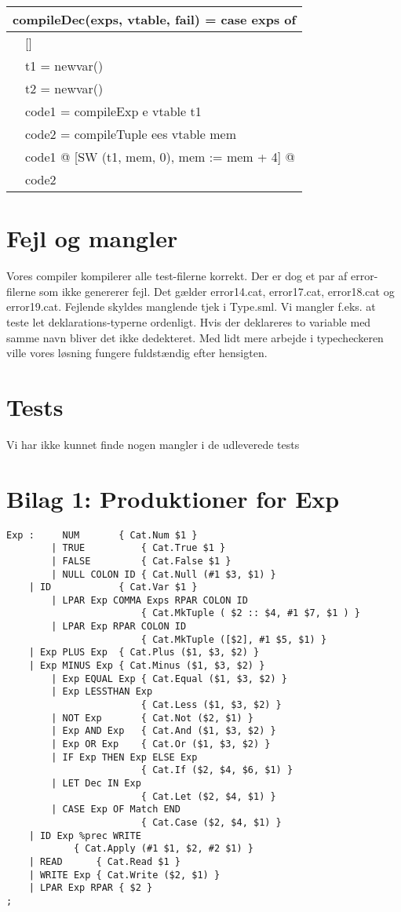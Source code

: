 \documentclass [10pt,a4paper]{article}
\begin{document}
\begin{tabular}{|l|l|}
  \hline
  \multicolumn{2}{|l|}{compileDec(exps, vtable, fail) = case exps of}
  \\ \hline
  [] & [] \\ \hline
  & t1 = newvar() \\
  & t2 = newvar() \\
  & code1 = compileExp e vtable t1 \\
  & code2 = compileTuple ees vtable mem \\
  & code1 @ [SW (t1, mem, 0), mem := mem + 4] @ \\
  & code2 \\ \hline
\end{tabular}

\section{Fejl og mangler}

Vores compiler kompilerer alle test-filerne korrekt. Der er dog et par
af error-filerne som ikke genererer fejl. Det gælder error14.cat,
error17.cat, error18.cat og error19.cat. Fejlende skyldes manglende
tjek i Type.sml.
Vi mangler f.eks. at teste let deklarations-typerne ordenligt. Hvis
der deklareres to variable med samme navn bliver det ikke
dedekteret. Med lidt mere arbejde i typecheckeren ville vores løsning
fungere fuldstændig efter hensigten.

\section {Tests}

Vi har ikke kunnet finde nogen mangler i de udleverede tests

\newpage 

\section{Bilag 1: Produktioner for Exp}

\begin{lstlisting}[frame=single,language=Clean]    
Exp :	  NUM		{ Cat.Num $1 }
        | TRUE          { Cat.True $1 }
        | FALSE         { Cat.False $1 }
        | NULL COLON ID { Cat.Null (#1 $3, $1) }
	| ID            { Cat.Var $1 }
        | LPAR Exp COMMA Exps RPAR COLON ID
                        { Cat.MkTuple ( $2 :: $4, #1 $7, $1 ) }
        | LPAR Exp RPAR COLON ID 
                        { Cat.MkTuple ([$2], #1 $5, $1) }
	| Exp PLUS Exp	{ Cat.Plus ($1, $3, $2) }
	| Exp MINUS Exp	{ Cat.Minus ($1, $3, $2) }
        | Exp EQUAL Exp { Cat.Equal ($1, $3, $2) }
        | Exp LESSTHAN Exp
                        { Cat.Less ($1, $3, $2) }
        | NOT Exp       { Cat.Not ($2, $1) }
        | Exp AND Exp   { Cat.And ($1, $3, $2) }
        | Exp OR Exp    { Cat.Or ($1, $3, $2) }
        | IF Exp THEN Exp ELSE Exp
                        { Cat.If ($2, $4, $6, $1) }
        | LET Dec IN Exp
                        { Cat.Let ($2, $4, $1) }
        | CASE Exp OF Match END
                        { Cat.Case ($2, $4, $1) }
	| ID Exp %prec WRITE
			{ Cat.Apply (#1 $1, $2, #2 $1) }
	| READ		{ Cat.Read $1 }
	| WRITE Exp	{ Cat.Write ($2, $1) }
	| LPAR Exp RPAR { $2 }
;
\end{lstlisting}
\end{document}
